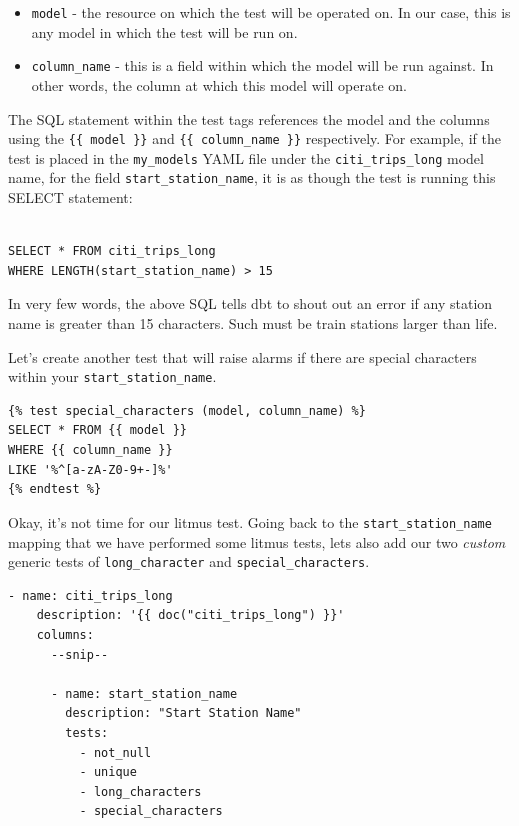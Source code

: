 \documentclass[
]{book}
\begin{document}
\begin{itemize}
\item
  \texttt{model} - the resource on which the test will be operated on. In our case, this is any model in which the test will be run on.
\item
  \texttt{column\_name} - this is a field within which the model will be run against. In other words, the column at which this model will operate on.
\end{itemize}

The SQL statement within the test tags references the model and the columns using the \texttt{\{\{\ model\ \}\}} and \texttt{\{\{\ column\_name\ \}\}} respectively. For example, if the test is placed in the \texttt{my\_models} YAML file under the \texttt{citi\_trips\_long} model name, for the field \texttt{start\_station\_name}, it is as though the test is running this SELECT statement:

\begin{verbatim}

SELECT * FROM citi_trips_long
WHERE LENGTH(start_station_name) > 15 
\end{verbatim}

In very few words, the above SQL tells dbt to shout out an error if any station name is greater than 15 characters. Such must be train stations larger than life.

Let's create another test that will raise alarms if there are special characters within your \texttt{start\_station\_name}.

\begin{verbatim}
{% test special_characters (model, column_name) %}
SELECT * FROM {{ model }}
WHERE {{ column_name }}
LIKE '%^[a-zA-Z0-9+-]%'
{% endtest %}
\end{verbatim}

Okay, it's not time for our litmus test. Going back to the \texttt{start\_station\_name} mapping that we have performed some litmus tests, lets also add our two \emph{custom} generic tests of \texttt{long\_character} and \texttt{special\_characters}.

\begin{verbatim}
- name: citi_trips_long
    description: '{{ doc("citi_trips_long") }}'
    columns:
      --snip--

      - name: start_station_name
        description: "Start Station Name"
        tests:
          - not_null
          - unique
          - long_characters
          - special_characters
\end{verbatim}
\end{document}
